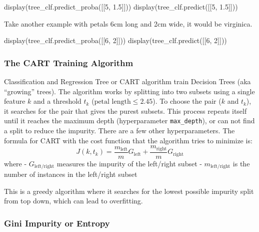 \documentclass[
  letterpaper,
  DIV=11,
  numbers=noendperiod]{scrartcl}
\newenvironment{Shaded}{\begin{snugshade}}{\end{snugshade}}
\newcommand{\DecValTok}[1]{\textcolor[rgb]{0.68,0.00,0.00}{#1}}
\newcommand{\FloatTok}[1]{\textcolor[rgb]{0.68,0.00,0.00}{#1}}
\newcommand{\NormalTok}[1]{\textcolor[rgb]{0.00,0.23,0.31}{#1}}
\begin{document}
\begin{Shaded}
\begin{Highlighting}[]
\NormalTok{display(tree\_clf.predict\_proba([[}\DecValTok{5}\NormalTok{, }\FloatTok{1.5}\NormalTok{]]))}
\NormalTok{display(tree\_clf.predict([[}\DecValTok{5}\NormalTok{, }\FloatTok{1.5}\NormalTok{]]))}
\end{Highlighting}
\end{Shaded}

Take another example with petals 6cm long and 2cm wide, it would be
virginica.

\begin{Shaded}
\begin{Highlighting}[]
\NormalTok{display(tree\_clf.predict\_proba([[}\DecValTok{6}\NormalTok{, }\DecValTok{2}\NormalTok{]]))}
\NormalTok{display(tree\_clf.predict([[}\DecValTok{6}\NormalTok{, }\DecValTok{2}\NormalTok{]]))}
\end{Highlighting}
\end{Shaded}

\subsubsection{The CART Training
Algorithm}\label{the-cart-training-algorithm}

Classification and Regression Tree or CART algorithm train Decision
Trees (aka ``growing'' trees). The algorithm works by splitting into two
subsets using a single feature \(k\) and a threshold \(t_k\)
(\(\text{petal length} \leq 2.45\)). To choose the pair (\(k\) and
\(t_k\)), it searches for the pair that gives the purest subsets. This
process repeats itself until it reaches the maximum depth
(hyperparameter \texttt{max\_depth}), or can not find a split to reduce
the impurity. There are a few other hyperparameters. The formula for
CART with the cost function that the algorithm tries to minimize is: \[
J(k,t_k) = \frac{m_{\text{left}}}{m}G_{\text{left}} + \frac{m_{\text{right}}}{m}G_{\text{right}}
\] where - \(G_{\text{left/right}}\) measures the impurity of the
left/right subset - \(m_{\text{left/right}}\) is the number of instances
in the left/right subset

This is a greedy algorithm where it searches for the lowest possible
impurity split from top down, which can lead to overfitting.

\subsubsection{Gini Impurity or Entropy}\label{gini-impurity-or-entropy}
\end{document}
